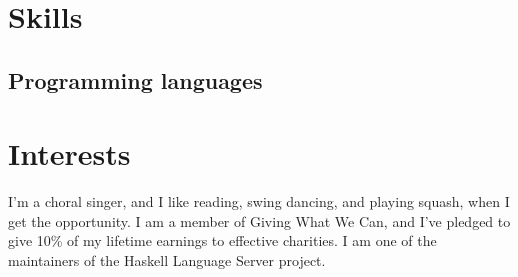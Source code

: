 \documentclass[12pt,a4paper,sans]{moderncv}
\begin{document}
\section{Skills}

\subsection{Programming languages}


\section{Interests}
I'm a choral singer, and I like reading, swing dancing, and playing squash, when I get the opportunity. 
I am a member of Giving What We Can, and I've pledged to give 10\% of my lifetime earnings to effective charities.
I am one of the maintainers of the Haskell Language Server project.
\end{document}
